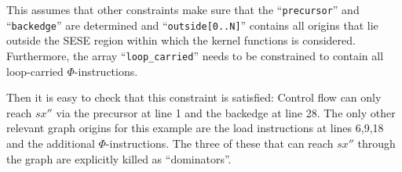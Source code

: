     \noindent
    This assumes that other constraints make sure that
    the ``\texttt{precursor}'' and ``\texttt{backedge}'' are determined and
    ``\texttt{outside[0..N]}'' contains
    all origins that lie outside the SESE region within which the kernel
    functions is considered.
    Furthermore, the array ``\texttt{loop\_carried}'' needs to be constrained to
    contain all loop-carried $\Phi$-instructions.

    Then it is easy to check that this constraint is satisfied:
    Control flow can only reach $sx''$ via the precursor at line 1 and the
    backedge at line 28.
    The only other relevant graph origins for this example are the load
    instructions at lines 6,9,18 and the additional $\Phi$-instructions.
    The three of these that can reach $sx''$ through the graph are explicitly
    killed as ``dominators''.

